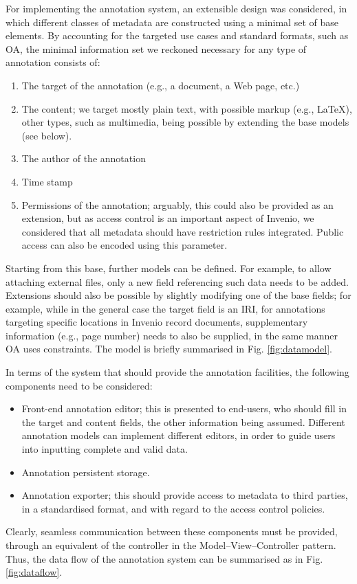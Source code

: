 
For implementing the annotation system, an extensible design was considered, in
which different classes of metadata are constructed using a minimal set of base
elements.  By accounting for the targeted use cases and standard formats, such
as OA, the minimal information set we reckoned necessary for any type of
annotation consists of:
\begin{enumerate}
  \item The target of the annotation (e.g., a document, a Web page, etc.)
  \item The content; we target mostly plain text, with possible markup
        (e.g., \LaTeX), other types, such as multimedia, being possible by
        extending the base models (see below).
  \item The author of the annotation
  \item Time stamp
  \item Permissions of the annotation; arguably, this could also be provided as
        an extension, but as access control is an important aspect of Invenio,
        we considered that all metadata should have restriction rules
        integrated. Public access can also be encoded using this parameter.
\end{enumerate}

Starting from this base, further models can be defined. For example, to allow
attaching external files, only a new field referencing such data needs to be
added. Extensions should also be possible by slightly modifying one of the base
fields; for example, while in the general case the target field is an IRI, for
annotations targeting specific locations in Invenio record documents,
supplementary information (e.g., page number) needs to also be supplied, in the
same manner OA uses constraints. The model is briefly summarised in Fig.
\ref{fig:datamodel}.

In terms of the system that should provide the annotation facilities, the
following components need to be considered:
\begin{itemize}
  \item Front-end annotation editor; this is presented to end-users,
        who should fill in the target and content fields, the other information
        being assumed. Different annotation models can implement different
        editors, in order to guide users into inputting complete and valid data.
  \item Annotation persistent storage.
  \item Annotation exporter; this should provide access to metadata to third
        parties, in a standardised format, and with regard to the access control
        policies.
\end{itemize}
Clearly, seamless communication between these components must be provided,
through an equivalent of the controller in the Model--View--Controller pattern.
Thus, the data flow of the annotation system can be summarised as in Fig.
\ref{fig:dataflow}.

